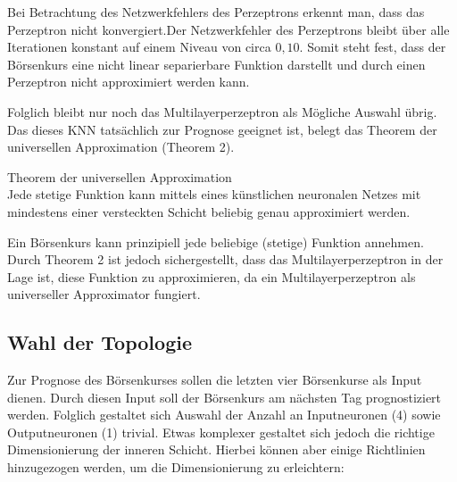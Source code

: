 Bei Betrachtung des Netzwerkfehlers des Perzeptrons erkennt man, dass das Perzeptron nicht konvergiert.Der Netzwerkfehler des Perzeptrons bleibt über alle Iterationen konstant auf einem Niveau von circa $0,10$. Somit steht fest, dass der Börsenkurs eine nicht linear separierbare Funktion darstellt und durch einen Perzeptron nicht approximiert werden kann.

Folglich bleibt nur noch das Multilayerperzeptron als Mögliche Auswahl übrig. Das dieses KNN tatsächlich zur Prognose geeignet ist, belegt das Theorem der universellen Approximation (Theorem 2).

\begin{theo}Theorem der universellen Approximation\\
Jede stetige Funktion kann mittels eines künstlichen neuronalen Netzes mit mindestens einer versteckten Schicht beliebig genau approximiert werden.
\end{theo}

Ein Börsenkurs kann prinzipiell jede beliebige (stetige) Funktion annehmen. Durch Theorem 2 ist jedoch sichergestellt, dass das Multilayerperzeptron in der Lage ist, diese Funktion zu approximieren, da ein Multilayerperzeptron als universeller Approximator fungiert.

\subsection{Wahl der Topologie}
\label{subsection:Wahl der Topologie}

Zur Prognose des Börsenkurses sollen die letzten vier Börsenkurse als Input dienen. Durch diesen Input soll der Börsenkurs am nächsten Tag prognostiziert werden. Folglich gestaltet sich Auswahl der Anzahl an Inputneuronen (4) sowie Outputneuronen (1) trivial.
Etwas komplexer gestaltet sich jedoch die richtige Dimensionierung der inneren Schicht. Hierbei können aber einige Richtlinien hinzugezogen werden, um die Dimensionierung zu erleichtern:

